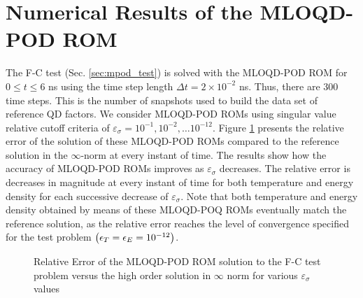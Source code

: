 \section{Numerical Results of the MLOQD-POD ROM} \label{sec:mloqd-pod_res}
	\ind The F-C test (Sec. \ref{sec:mpod_test}) is solved with the MLOQD-POD ROM for $0 \le t  \le 6$ ns using  the time step length $\Delta t=2 \times 10^{-2}$ ns. Thus, there are 300 time steps. This is the number of snapshots used to build the data set of reference QD factors. We consider MLOQD-POD ROMs using singular value relative cutoff criteria of $\varepsilon_\sigma = 10^{-1}, 10^{-2}, \dots 10^{-12}$. Figure \ref{fig:ref_errs_inf} presents the relative error of the solution of these MLOQD-POD ROMs compared to the  reference solution in the  $\infty$-norm at every instant of time. The results show how the accuracy of MLOQD-POD ROMs improves as $\varepsilon_\sigma$  decreases. The relative error is decreases in magnitude at every instant of time for both temperature and energy density for each successive decrease of $\varepsilon_\sigma$. Note that  both temperature and energy density obtained by means of these MLOQD-POQ ROMs eventually match the reference solution, as the relative error reaches the level of convergence specified for the test problem $\left(\epsilon_T=\epsilon_E=10^{-12}\right)$.

	\begin{figure}[ht!]
		\centering
		\caption{\label{fig:ref_errs_inf}
			Relative Error of the MLOQD-POD ROM solution to the F-C test problem versus the high order solution in $\infty$ norm for various $\varepsilon_\sigma$ values}
	\end{figure}

